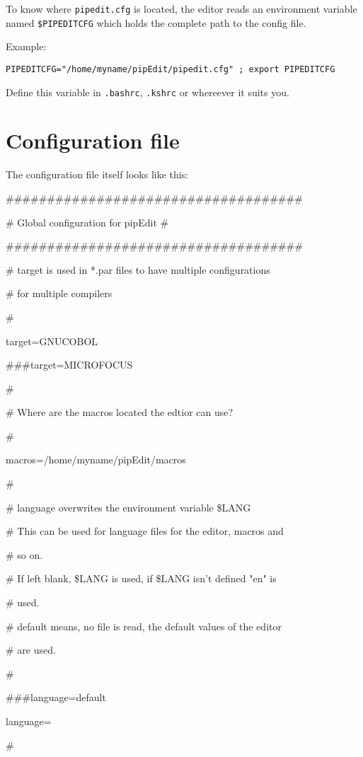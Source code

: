\documentclass{report}
\begin{document}
To know where \texttt{pipedit.cfg} is located, the editor reads an environment 
variable named \texttt{\$PIPEDITCFG} which holds the complete path 
to the config file. \\ \break

Example:

\texttt{PIPEDITCFG="/home/myname/pipEdit/pipedit.cfg" ; export PIPEDITCFG} \break

Define this variable in \texttt{.bashrc}, \texttt{.kshrc} 
or whereever it suits you.

\section{Configuration file}

The configuration file itself looks like this:

\#\#\#\#\#\#\#\#\#\#\#\#\#\#\#\#\#\#\#\#\#\#\#\#\#\#\#\#\#\#\#\#\#\#\#\#

\# Global configuration for pipEdit \#

\#\#\#\#\#\#\#\#\#\#\#\#\#\#\#\#\#\#\#\#\#\#\#\#\#\#\#\#\#\#\#\#\#\#\#\#

\# target is used in *.par files to have multiple configurations  

\# for multiple compilers

\#

target=GNUCOBOL

\#\#\#target=MICROFOCUS

\#

\# Where are the macros located the edtior can use?

\#

macros=/home/myname/pipEdit/macros

\#

\# language overwrites the environment variable \$LANG

\# This can be used for language files for the editor, macros and 

\# so on.

\# If left blank, \$LANG is used, if \$LANG isn't defined "en" is

\# used.

\# default means, no file is read, the default values of the editor

\# are used.

\#

\#\#\#language=default

language=

\#
\end{document}

